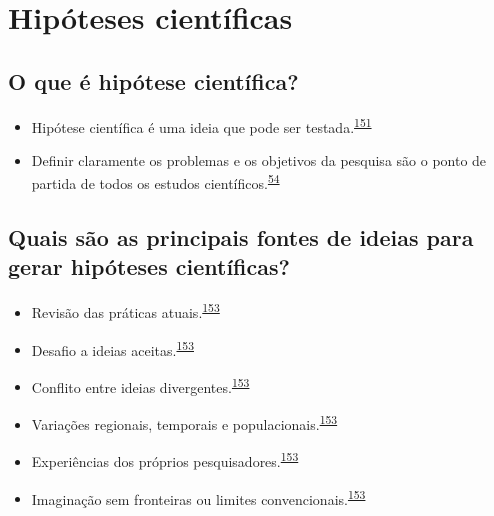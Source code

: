 \documentclass[
  a4paper,
]{book}
\begin{document}
\hypertarget{ideias-hipoteses}{%
\section{Hipóteses científicas}\label{ideias-hipoteses}}

\hypertarget{o-que-uxe9-hipuxf3tese-cientuxedfica}{%
\subsection{O que é hipótese científica?}\label{o-que-uxe9-hipuxf3tese-cientuxedfica}}

\begin{itemize}
\item
  Hipótese científica é uma ideia que pode ser testada.\textsuperscript{\protect\hyperlink{ref-Curran-Everett2009}{151}}
\item
  Definir claramente os problemas e os objetivos da pesquisa são o ponto de partida de todos os estudos científicos.\textsuperscript{\protect\hyperlink{ref-van2022a}{54}}
\end{itemize}

\hypertarget{quais-suxe3o-as-principais-fontes-de-ideias-para-gerar-hipuxf3teses-cientuxedficas}{%
\subsection{Quais são as principais fontes de ideias para gerar hipóteses científicas?}\label{quais-suxe3o-as-principais-fontes-de-ideias-para-gerar-hipuxf3teses-cientuxedficas}}

\begin{itemize}
\item
  Revisão das práticas atuais.\textsuperscript{\protect\hyperlink{ref-Vandenbroucke2018}{153}}
\item
  Desafio a ideias aceitas.\textsuperscript{\protect\hyperlink{ref-Vandenbroucke2018}{153}}
\item
  Conflito entre ideias divergentes.\textsuperscript{\protect\hyperlink{ref-Vandenbroucke2018}{153}}
\item
  Variações regionais, temporais e populacionais.\textsuperscript{\protect\hyperlink{ref-Vandenbroucke2018}{153}}
\item
  Experiências dos próprios pesquisadores.\textsuperscript{\protect\hyperlink{ref-Vandenbroucke2018}{153}}
\item
  Imaginação sem fronteiras ou limites convencionais.\textsuperscript{\protect\hyperlink{ref-Vandenbroucke2018}{153}}
\end{itemize}
\end{document}
